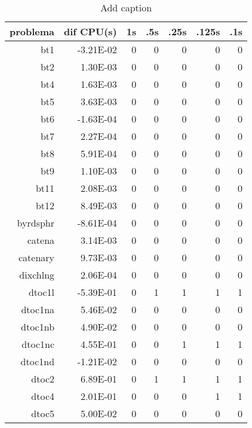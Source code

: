 \begin{table}[htbp]
  \centering
  \caption{Add caption}
    \begin{tabular}{rrrrrrr}
    \toprule
    \textbf{problema} & \textbf{dif CPU(s)} & \textbf{1s} & \textbf{.5s} & \textbf{.25s} & \textbf{.125s} & \textbf{.1s} \\
    \midrule
    bt1   & -3.21E-02 & 0     & 0     & 0     & 0     & 0 \\
    bt2   & 1.30E-03 & 0     & 0     & 0     & 0     & 0 \\
    bt4   & 1.63E-03 & 0     & 0     & 0     & 0     & 0 \\
    bt5   & 3.63E-03 & 0     & 0     & 0     & 0     & 0 \\
    bt6   & -1.63E-04 & 0     & 0     & 0     & 0     & 0 \\
    bt7   & 2.27E-04 & 0     & 0     & 0     & 0     & 0 \\
    bt8   & 5.91E-04 & 0     & 0     & 0     & 0     & 0 \\
    bt9   & 1.10E-03 & 0     & 0     & 0     & 0     & 0 \\
    bt11  & 2.08E-03 & 0     & 0     & 0     & 0     & 0 \\
    bt12  & 8.49E-03 & 0     & 0     & 0     & 0     & 0 \\
    byrdsphr & -8.61E-04 & 0     & 0     & 0     & 0     & 0 \\
    catena & 3.14E-03 & 0     & 0     & 0     & 0     & 0 \\
    catenary & 9.73E-03 & 0     & 0     & 0     & 0     & 0 \\
    dixchlng & 2.06E-04 & 0     & 0     & 0     & 0     & 0 \\
    dtoc1l & -5.39E-01 & 0     & 1     & 1     & 1     & 1 \\
    dtoc1na & 5.46E-02 & 0     & 0     & 0     & 0     & 0 \\
    dtoc1nb & 4.90E-02 & 0     & 0     & 0     & 0     & 0 \\
    dtoc1nc & 4.55E-01 & 0     & 0     & 1     & 1     & 1 \\
    dtoc1nd & -1.21E-02 & 0     & 0     & 0     & 0     & 0 \\
    dtoc2 & 6.89E-01 & 0     & 1     & 1     & 1     & 1 \\
    dtoc4 & 2.01E-01 & 0     & 0     & 0     & 1     & 1 \\
    dtoc5 & 5.00E-02 & 0     & 0     & 0     & 0     & 0 \\

\end{tabular}
\end{table}

